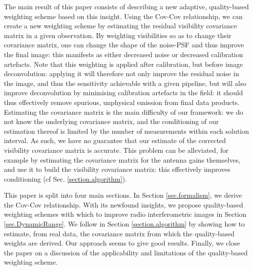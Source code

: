 \pg
The main result of this paper consists of describing a new adaptive, quality-based weighting scheme based on this insight. Using the Cov-Cov relationship, we can {create a new} weighting scheme by estimating the residual visibility covariance matrix in a given observation. By weighting {visibilities} so as to change their covariance matrix, one can change the shape of the noise-PSF and thus improve {the final image}: this manifests as either decreased noise or decreased calibration artefacts. Note that this weighting is applied after calibration, but before image deconvolution: applying it will therefore not only improve the residual noise in the image, and thus the sensitivity achievable with a given pipeline, but will also improve deconvolution by minimising calibration artefacts in the field: it should thus effectively remove spurious, unphysical emission from final data products. Estimating the covariance matrix is the main difficulty of our framework: we do not know the underlying covariance matrix, and the conditioning of our estimation thereof is limited by the number of measurements within each {solution interval}. As such, we have no guarantee that our estimate of the corrected visibility covariance matrix is accurate. This problem can be alleviated, for example {by estimating the covariance matrix for the antenna gains themselves}, and use {it} to build the visibility covariance matrix: this effectively improves conditioning (cf Sec. \ref{section.algorithm}). 

\pg
This paper is split into four main sections. In Section \ref{sec.formalism}, we derive the Cov-Cov relationship. With its newfound insights, we propose quality-based weighting schemes with which to improve radio interferometric images in Section \ref{sec.DynamicRange}. We follow in Section \ref{section.algorithm} by showing how to estimate, from real data, the covariance matrix from which the quality-based weights are derived. Our approach seems to give good results. Finally, we close the paper on a discussion of the applicability and limitations of the quality-based weighting scheme.



